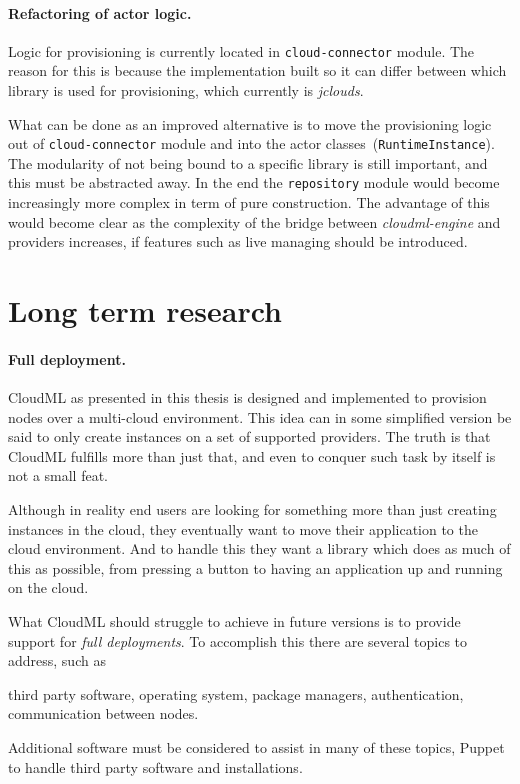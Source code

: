 \paragraph{Refactoring of actor logic.}

Logic for provisioning is currently located in \texttt{cloud-connector} module.
The reason for this is because the implementation built so it can differ between which library is used for provisioning, 
which currently is \emph{jclouds}.

What can be done as an improved alternative is to move the provisioning logic out of \texttt{cloud-connector} 
module and into the actor classes~(\texttt{RuntimeInstance}).
The modularity of not being bound to a specific library is still important, and this must be abstracted away.
In the end the \texttt{repository} module would become increasingly more complex in term of pure construction.
The advantage of this would become clear as the complexity of the bridge between \emph{cloudml-engine}
and providers increases, \eg if features such as live managing should be introduced.

\section{Long term research}

\paragraph{Full deployment.}

CloudML as presented in this thesis is designed and implemented to provision nodes over a multi-cloud environment.
This idea can in some simplified version be said to only create instances on a set of supported providers.
The truth is that CloudML fulfills more than just that, and even to conquer such task by itself is not a small feat.

Although in reality end users are looking for something more than just creating instances in the cloud,
they eventually want to move their application to the cloud environment.
And to handle this they want a library which does as much of this as possible,
from pressing a button to having an application up and running on the cloud.

What CloudML should struggle to achieve in future versions is to provide support for \emph{full deployments}.
To accomplish this there are several topics to address, such as
\begin{ii}
  \iitem third party software,
  \iitem operating system,
  \iitem package managers,
  \iitem authentication,
  \iitem communication between nodes.
\end{ii}
Additional software must be considered to assist in many of these topics,
\eg Puppet to handle third party software and installations.

